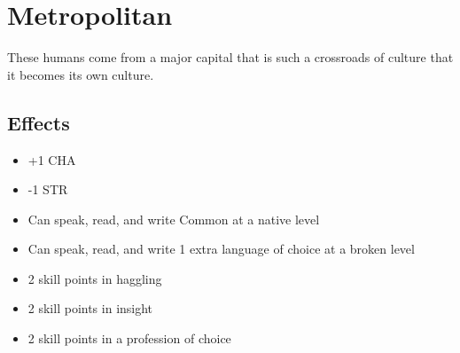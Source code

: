 \section{Metropolitan}\label{culture:metropolitan}
These humans come from a major capital that is such a crossroads of culture
that it becomes its own culture.

\subsection{Effects}
\begin{itemize}
    \item +1 CHA
    \item -1 STR
    \item Can speak, read, and write Common at a native level
    \item Can speak, read, and write 1 extra language of choice at a broken
        level
    \item 2 skill points in haggling
    \item 2 skill points in insight
    \item 2 skill points in a profession of choice
\end{itemize}
